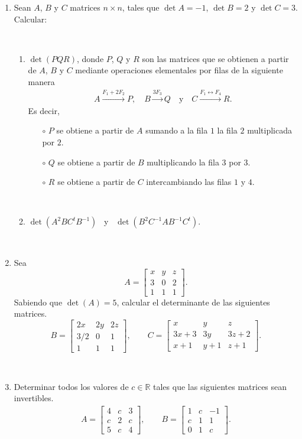 \documentclass[12pt]{amsart}
\begin{document}
\begin{enumerate}
\

\item Sean $A$, $B$ y $C$ matrices $n\times n$, tales que $\det A=-1$, $\det B=2$ y $\det C=3$.
Calcular:

\

\begin{enumerate}
\item $\det(PQR)$, donde $P$, $Q$ y $R$ son las matrices que se obtienen a partir de $A$, $B$ y $C$ mediante operaciones elementales por filas de la siguiente manera
 \begin{align*}
 A\overset{F_1+2F_2}{\longrightarrow} P,\quad
 B\overset{3F_3}{\longrightarrow} Q
 \quad\mbox{y}\quad
 C\overset{F_1\leftrightarrow F_4}{\longrightarrow} R.
 \end{align*}
 Es decir,
 \begin{itemize}
  \item[$\circ$] $P$ se obtiene a partir de $A$ sumando a la fila $1$ la fila $2$ multiplicada por $2$.
  \item[$\circ$] $Q$ se obtiene a partir de $B$ multiplicando la fila $3$ por $3$.
  \item[$\circ$] $R$ se obtiene a partir de $C$ intercambiando las filas $1$ y $4$.
 \end{itemize}

\

\item $\det(A^2BC^tB^{-1})$ \ y \ $\det(B^2C^{-1}AB^{-1}C^{t})$.

\end{enumerate}


\

\item  Sea
$$A=
\begin{bmatrix}
	x&y&z \\
	3&0&2\\
	1&1&1
\end{bmatrix}.$$
Sabiendo que $\det(A) = 5$, calcular el determinante de las siguientes matrices.
$$
B = \begin{bmatrix}
2x&2y&2z \\
3/2&0&1\\
1&1&1
\end{bmatrix}, \qquad
C=
\begin{bmatrix}
	x&y&z \\
	3x+3&3y&3z+2\\
	x+1&y+1&z+1
\end{bmatrix}.
$$

\

\item Determinar todos los valores de $c\in\mathbb{R}$ tales que las siguientes matrices sean invertibles.
\begin{align*}
A=\begin{bmatrix}4& c&3\\c&2&c\\ 5&c&4 \end{bmatrix},\qquad
B=\begin{bmatrix} 1&c&-1\\ c&1&1\\0&1&c\end{bmatrix}.
\end{align*}



\end{enumerate}
\end{document}
